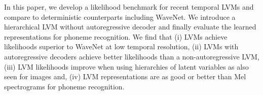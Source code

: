 {In this paper, we develop a likelihood benchmark for recent temporal LVMs and compare to deterministic counterparts including WaveNet. We introduce a hierarchical LVM without autoregressive decoder and finally evaluate the learned representations for phoneme recognition. We find that 
(i) LVMs achieve likelihoods superior to WaveNet at low temporal resolution, 
(ii) LVMs with autoregressive decoders achieve better likelihoods than a non-autoregressive LVM, 
(iii) LVM likelihoods improve when using hierarchies of latent variables as also seen for images and, 
(iv) LVM representations are as good or better than Mel spectrograms for phoneme recognition.


\begin{figure*}[t!]
    \centering
    \begin{multicols}{5}
    \setlength\columnsep{0mm}
    \\
\end{multicols}
\end{figure*}}
